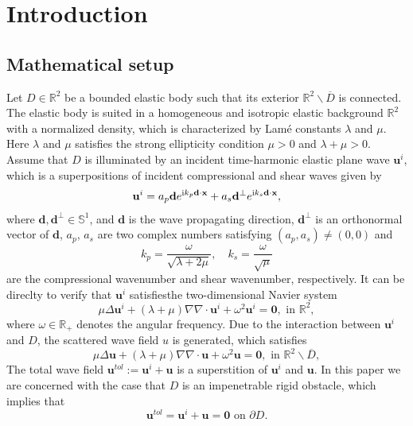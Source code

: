 \documentclass[11pt,reqno,twoside]{amsart}
\theoremstyle{definition}
\theoremstyle{remark}
\numberwithin{equation}{section}
\newcommand{\bmf}[1]{{\mathbf{#1}}}
\begin{document}
	
	\section{Introduction}
	
	\subsection{Mathematical setup}
	
	
	\iffalse
	Let $D \in \mathbb R^2$ be a bounded elastic body such that its exterior $\mathbb{R}^2 \backslash \overline D $ is connected. The elastic body is suited in a homogeneous and isotropic elastic background $\mathbb R^2$ with a normalized density, which is characterized by Lam\'{e} constants $\lambda$ and $\mu$. Here $\lambda$ and $\mu$ satisfies the strong ellipticity condition $ \mu> 0 $ and $\lambda+\mu>0$.  Assume that $D$ is illuminated by an incident time-harmonic elastic plane wave $\bmf{u}^i$, which 
	 is a superpositions of incident compressional  and shear waves given by
	\begin{align}\label{eq:ui}
		\bmf{u}^i=a_p \mathbf d e^{{\rm i } k_p \mathbf d \cdot \mathbf x} +a_s \mathbf d^\perp e^{{\rm i } k_s \mathbf d \cdot \mathbf x},
	\end{align}
 	where $\mathbf d, \mathbf d^\perp  \in \mathbb S^1 $, and $\mathbf d$ is the  wave propagating direction, $\mathbf d^\perp$ is an orthonormal vector of $\mathbf d$, $a_p$, $a_s$ are two complex numbers satisfying $(a_p,a_s) \neq (0,0)$ and 
 	$$
 	k_p=\frac{\omega}{\sqrt{\lambda +2\mu}},\quad k_s=\frac{\omega}{\sqrt{\mu}}
 	$$
 	are the compressional wavenumber and shear wavenumber, respectively. It can be direclty to verify that $\bmf{u}^i$ satisfiesthe two-dimensional Navier system
	\begin{equation}
		\mu \Delta \mathbf u^i+(\lambda+\mu)\nabla \nabla \cdot \bmf{u}^i+\omega^2\bmf{u}^i=\bmf 0, \text{ in } \mathbb{R}^2,
	\end{equation}
   where $\omega\in \mathbb R_+$ denotes the angular frequency.  	Due to the interaction between $\bmf u^i$ and $D$, the scattered wave field $u$ is generated, which satisfies 
  \begin{equation}\label{eq:syst1}
	\mu \Delta \mathbf u+(\lambda+\mu)\nabla \nabla \cdot \bmf{u}+\omega^2\bmf{u}=\bmf 0,
    \text{ in } \mathbb{R}^2 \backslash \overline D, 
    \end{equation} 
    The total wave field  $\bmf{u}^{tol}:=\bmf{u}^i +\bmf{u}$ is a superstition of $\bmf u^i$ and $\bmf u$.   In this paper we are concerned with the case that $D$ is an impenetrable rigid obstacle, which implies that 
    \begin{equation}\label{eq:BoundaryCondition}
	\bmf{u}^{tol}=\bmf{u}^i +\bmf{u} =\bmf 0 \text{ on } \partial D. 
	\end{equation}
	
\end{document}
